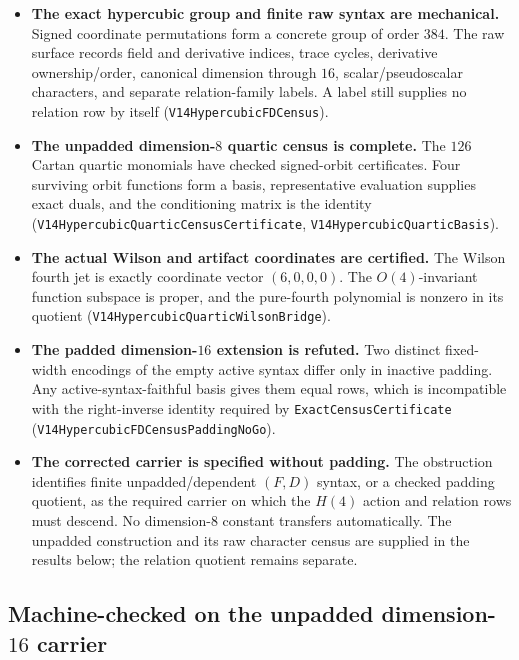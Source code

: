 \documentclass[11pt]{article}
\theoremstyle{definition}
\begin{document}
\begin{itemize}
  \item \textbf{The exact hypercubic group and finite raw syntax are
    mechanical.} Signed coordinate permutations form a concrete group of
    order $384$. The raw surface records field and derivative indices, trace
    cycles, derivative ownership/order, canonical dimension through $16$,
    scalar/pseudoscalar characters, and separate relation-family labels. A
    label still supplies no relation row by itself
    (\texttt{V14HypercubicFDCensus}).
  \item \textbf{The unpadded dimension-$8$ quartic census is complete.}
    The $126$ Cartan quartic monomials have checked signed-orbit certificates.
    Four surviving orbit functions form a basis, representative evaluation
    supplies exact duals, and the conditioning matrix is the identity
    (\texttt{V14HypercubicQuarticCensusCertificate},
    \texttt{V14HypercubicQuarticBasis}).
  \item \textbf{The actual Wilson and artifact coordinates are certified.}
    The Wilson fourth jet is exactly coordinate vector $(6,0,0,0)$. The
    $O(4)$-invariant function subspace is proper, and the pure-fourth
    polynomial is nonzero in its quotient
    (\texttt{V14HypercubicQuarticWilsonBridge}).
  \item \textbf{The padded dimension-$16$ extension is refuted.} Two distinct
    fixed-width encodings of the empty active syntax differ only in inactive
    padding. Any active-syntax-faithful basis gives them equal rows, which is
    incompatible with the right-inverse identity required by
    \texttt{ExactCensusCertificate}
    (\texttt{V14HypercubicFDCensusPaddingNoGo}).
  \item \textbf{The corrected carrier is specified without padding.} The
    obstruction identifies finite unpadded/dependent $(F,D)$ syntax, or a
    checked padding quotient, as the required carrier on which the $H(4)$
    action and relation rows must descend. No dimension-$8$ constant transfers
    automatically. The unpadded construction and its raw character census are
    supplied in the results below; the relation quotient remains separate.
\end{itemize}

\subsection*{Machine-checked on the unpadded dimension-$16$ carrier}
\end{document}
